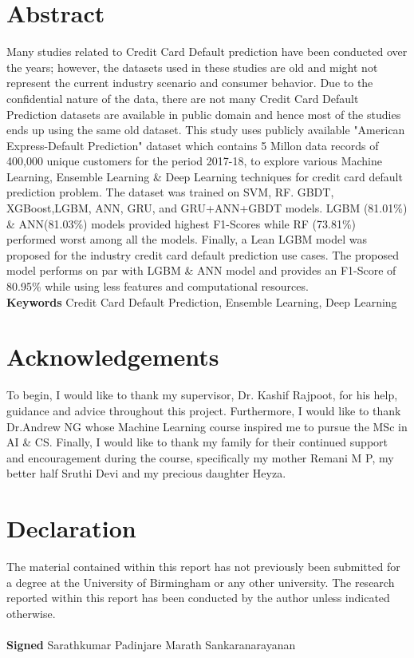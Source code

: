 \documentclass[twoside,11pt,a4paper]{article}
\begin{document}
\section*{\centering Abstract}	
Many studies related to Credit Card Default prediction have been conducted over the years; however, the datasets used in these studies are old and might not represent the current industry scenario and consumer behavior. Due to the confidential nature of the data, there are not many Credit Card Default Prediction datasets are available in public domain and hence most of the studies ends up using the same old dataset. This study uses publicly available "American Express-Default Prediction" dataset which contains 5 Millon data records of 400,000 unique customers for the period 2017-18, to explore various Machine Learning, Ensemble Learning \& Deep Learning techniques for credit card default prediction problem. The dataset was trained on \acf{SVM}, \acf{RF}. \acf{GBDT}, \acf{XGBoost},\acf{LGBM}, \acf{ANN}, \acf{GRU}, and \acs{GRU}+\acs{ANN}+\acs{GBDT} models. \acs{LGBM} (81.01\%) \& \acs{ANN}(81.03\%) models provided highest F1-Scores while \acs{RF} (73.81\%) performed worst among all the models. Finally, a Lean \acs{LGBM} model was proposed for the industry  credit card default prediction use cases. The proposed model performs on par with \acs{LGBM} \& \acs{ANN} model and provides an F1-Score of 80.95\% while using less features and computational resources.\\



\textbf{Keywords} Credit Card Default Prediction, Ensemble Learning, Deep Learning

\vfill
\clearpage

\section*{\centering Acknowledgements}
To begin, I would like to thank my supervisor, Dr. Kashif Rajpoot, for his help, guidance and
advice throughout this project. Furthermore, I would like to thank Dr.Andrew NG whose Machine Learning course inspired me to pursue the MSc in AI \& CS.
Finally, I would like to thank my family for their continued support and encouragement during the course, specifically my mother Remani M P, my better half Sruthi Devi and my precious daughter Heyza.

\vfill
\clearpage
\section*{\centering Declaration}
The material contained within this report has not previously been
submitted for a degree at the University of Birmingham or any other university.
The research reported within this report has been conducted by the author
unless indicated otherwise.\\
\\
\textbf{Signed} Sarathkumar Padinjare Marath Sankaranarayanan 
\end{document}
